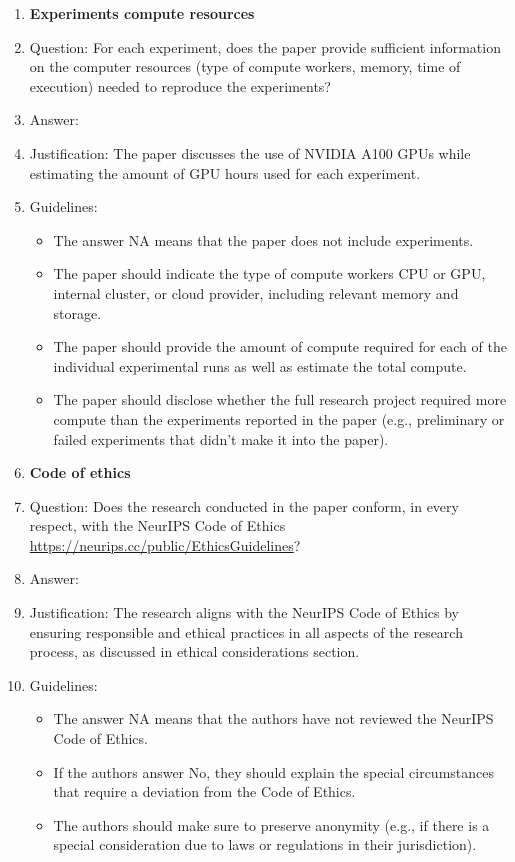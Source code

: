 \documentclass{article}
\begin{document}
\begin{enumerate}
\item {\bf Experiments compute resources}
    \item[] Question: For each experiment, does the paper provide sufficient information on the computer resources (type of compute workers, memory, time of execution) needed to reproduce the experiments?
    \item[] Answer: \answerYes{} %
    \item[] Justification: The paper discusses the use of NVIDIA A100 GPUs while estimating the amount of GPU hours used for each experiment.
    \item[] Guidelines:
    \begin{itemize}
        \item The answer NA means that the paper does not include experiments.
        \item The paper should indicate the type of compute workers CPU or GPU, internal cluster, or cloud provider, including relevant memory and storage.
        \item The paper should provide the amount of compute required for each of the individual experimental runs as well as estimate the total compute. 
        \item The paper should disclose whether the full research project required more compute than the experiments reported in the paper (e.g., preliminary or failed experiments that didn't make it into the paper). 
    \end{itemize}
    
\item {\bf Code of ethics}
    \item[] Question: Does the research conducted in the paper conform, in every respect, with the NeurIPS Code of Ethics \url{https://neurips.cc/public/EthicsGuidelines}?
    \item[] Answer: \answerYes{} %
    \item[] Justification: The research aligns with the NeurIPS Code of Ethics by ensuring responsible and ethical practices in all aspects of the research process, as discussed in ethical considerations section.
    \item[] Guidelines:
    \begin{itemize}
        \item The answer NA means that the authors have not reviewed the NeurIPS Code of Ethics.
        \item If the authors answer No, they should explain the special circumstances that require a deviation from the Code of Ethics.
        \item The authors should make sure to preserve anonymity (e.g., if there is a special consideration due to laws or regulations in their jurisdiction).
    \end{itemize}



\end{enumerate}
\end{document}
